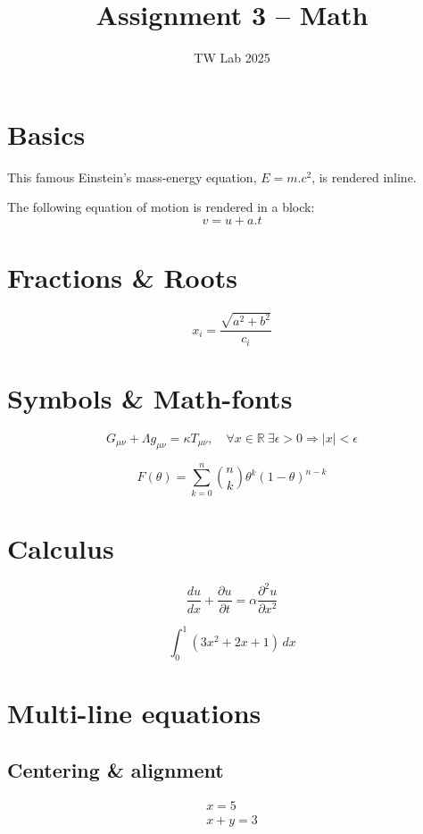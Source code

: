 \documentclass[12pt,a4paper]{article}
\title{Assignment 3 -- Math}
\author{TW Lab 2025}
\date{}
\begin{document}
\maketitle

\section{Basics}

This famous Einstein's mass-energy equation, \(E = m.c^2\), is rendered inline.

The following equation of motion is rendered in a block:
\[
v = u + a.t
\]

\section{Fractions \& Roots}

\[
x_i = \frac{\sqrt{a^2+b^2}}{c_i}
\]

\section{Symbols \& Math-fonts}

\[
G_{\mu\nu} + \Lambda g_{\mu\nu} = \kappa T_{\mu\nu},
\quad \forall x \in \mathbb{R}\ \exists \epsilon > 0
\Rightarrow |x| < \epsilon
\]

\[
F(\theta) = \sum_{k=0}^{n} \binom{n}{k}
\theta^k(1-\theta)^{n-k}
\]

\section{Calculus}

\[
\frac{du}{dx} + \frac{\partial u}{\partial t}
= \alpha \frac{\partial^2 u}{\partial x^2}
\]

\[
\int_0^1 (3x^2+2x+1)\,dx
\]

\section{Multi-line equations}

\subsection{Centering \& alignment}

\begin{gather}
x = 5 \\
x+y = 3
\end{gather}
\end{document}
